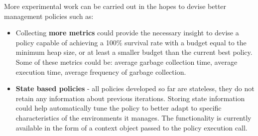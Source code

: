 \documentclass{l4proj}
\begin{document}
More experimental work can be carried out in the hopes to devise better management policies such as:
\begin{itemize}
\item Collecting \textbf{more metrics} could provide the necessary insight to devise a policy capable of achieving a 100\% survival rate with a budget equal to the minimum heap size, or at least a smaller budget than the current best policy. Some of these metrics could be: average garbage collection time, average execution time, average frequency of garbage collection.
\item \textbf{State based policies} - all policies developed so far are stateless, they do not retain any information about previous iterations. Storing state information could help automatically tune the policy to better adapt to specific characteristics of the environments it manages. The functionality is currently available in the form of a context object passed to the policy execution call.  
\end{itemize}
\hspace*{3em} 
\end{document}
